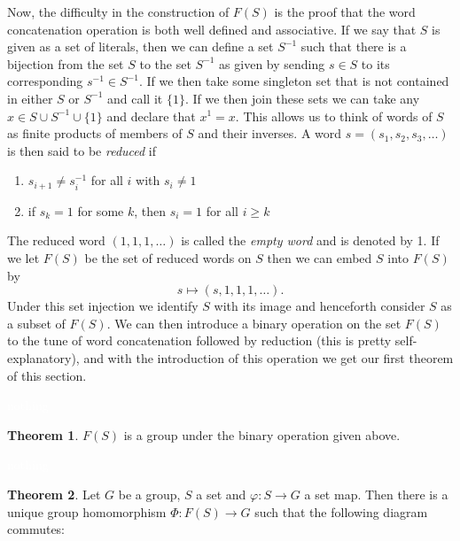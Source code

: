 \documentclass{article}
\theoremstyle{definition}
\newtheorem{thm}{Theorem}[section]
\newcommand{\nl}{\textcolor{white}{nothing}}
\newcommand{\ra}{\rightarrow}
\newcommand{\inv}{^{-1}}
\newcommand{\vphi}{\varphi}
\begin{document}
\begin{center}
\end{center}

Now, the difficulty in the construction of $F(S)$ is the proof that the word concatenation operation is both well defined and associative. If we say that $S$ is given as a set of literals, then we can define a set $S\inv$ such that there is a bijection from the set $S$ to the set $S\inv$ as given by sending $s\in S$ to its corresponding $s\inv \in S\inv$. If we then take some singleton set that is not contained in either $S$ or $S\inv$ and call it $\{1\}$. If we then join these sets we can take any $x\in S\cup S\inv\cup\{1\}$ and declare that $x^1 = x$. This allows us to think of words of $S$ as finite products of members of $S$ and their inverses. A word $s = (s_1,s_2,s_3,\ldots)$ is then said to be \textit{reduced} if 
\begin{enumerate}
\item $s_{i + 1} \neq s_i\inv$ for all $i$ with $s_i\neq 1$
\item if $s_k = 1$ for some $k$, then $s_i = 1$ for all $i\geq k$
\end{enumerate}

The reduced word $(1,1,1,\ldots)$ is called the \textit{empty word} and is denoted by 1. If we let $F(S)$ be the set of reduced words on $S$ then we can embed $S$ into $F(S)$ by 
\[s\mapsto (s,1,1,1,\ldots ).\]
Under this set injection we identify $S$ with its image and henceforth consider $S$ as a subset of $F(S)$. We can then introduce a binary operation on the set $F(S)$ to the tune of word concatenation followed by reduction (this is pretty self-explanatory), and with the introduction of this operation we get our first theorem of this section.

\nl

\begin{thm}
$F(S)$ is a group under the binary operation given above.
\end{thm}

\nl

\begin{thm}
Let $G$ be a group, $S$ a set and $\vphi:S\ra G$ a set map. Then there is a unique group homomorphism $\Phi:F(S)\ra G$ such that the following diagram commutes:
\begin{center}
\end{center}
\end{thm}
\end{document}
